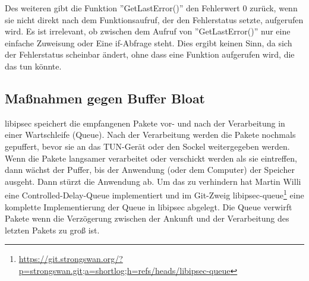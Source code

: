 Des weiteren gibt die Funktion ''GetLastError()'' den Fehlerwert 0 zurück, wenn sie nicht
direkt nach dem Funktionsaufruf, der den Fehlerstatus setzte, aufgerufen wird.
Es ist irrelevant, ob zwischen dem Aufruf von ''GetLastError()'' nur eine einfache Zuweisung
oder Eine if-Abfrage steht.
Dies ergibt keinen Sinn, da sich der Fehlerstatus scheinbar ändert, ohne dass
eine Funktion aufgerufen wird, die das tun könnte.


\subsection{Maßnahmen gegen Buffer Bloat}
libipsec speichert die empfangenen Pakete vor- und nach der Verarbeitung in einer 
Wartschleife (Queue).
Nach der Verarbeitung werden die Pakete nochmals gepuffert, bevor sie an das TUN-Gerät 
oder den Sockel
weitergegeben werden. Wenn die Pakete langsamer verarbeitet oder verschickt werden 
als sie eintreffen,
dann wächst der Puffer, bis der Anwendung (oder dem Computer) der Speicher ausgeht. 
Dann stürzt die Anwendung ab.
Um das zu verhindern hat Martin Willi eine Controlled-Delay-Queue implementiert und 
im Git-Zweig libipsec-queue\footnote{\url{https://git.strongswan.org/?p=strongswan.git;a=shortlog;h=refs/heads/libipsec-queue}} 
eine komplette Implementierung der Queue in libipsec abgelegt.
Die Queue verwirft Pakete wenn die Verzögerung zwischen der Ankunft und der Verarbeitung
des letzten Pakets zu groß ist.
